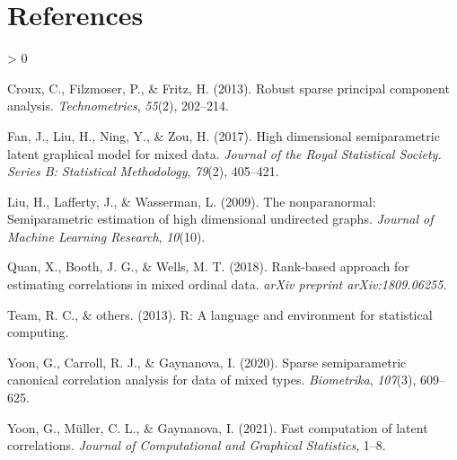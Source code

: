 \documentclass[10pt,a4paper,onecolumn]{article}
\newlength{\cslhangindent}
\newenvironment{CSLReferences}[2] %
 {%
  \setlength{\parindent}{0pt}
  \ifodd #1 \everypar{\setlength{\hangindent}{\cslhangindent}}\ignorespaces\fi
  \ifnum #2 > 0
  \setlength{\parskip}{#2\baselineskip}
  \fi
 }%
 {}
\begin{document}
\hypertarget{references}{%
\section*{References}\label{references}}

\hypertarget{refs}{}
\begin{CSLReferences}{1}{0}
\leavevmode\hypertarget{ref-croux2013robust}{}%
Croux, C., Filzmoser, P., \& Fritz, H. (2013). Robust sparse principal
component analysis. \emph{Technometrics}, \emph{55}(2), 202--214.

\leavevmode\hypertarget{ref-fan2017high}{}%
Fan, J., Liu, H., Ning, Y., \& Zou, H. (2017). High dimensional
semiparametric latent graphical model for mixed data. \emph{Journal of
the Royal Statistical Society. Series B: Statistical Methodology},
\emph{79}(2), 405--421.

\leavevmode\hypertarget{ref-liu2009nonparanormal}{}%
Liu, H., Lafferty, J., \& Wasserman, L. (2009). The nonparanormal:
Semiparametric estimation of high dimensional undirected graphs.
\emph{Journal of Machine Learning Research}, \emph{10}(10).

\leavevmode\hypertarget{ref-quan2018rank}{}%
Quan, X., Booth, J. G., \& Wells, M. T. (2018). Rank-based approach for
estimating correlations in mixed ordinal data. \emph{arXiv preprint
arXiv:1809.06255}.

\leavevmode\hypertarget{ref-team2013r}{}%
Team, R. C., \& others. (2013). R: A language and environment for
statistical computing.

\leavevmode\hypertarget{ref-yoon2020sparse}{}%
Yoon, G., Carroll, R. J., \& Gaynanova, I. (2020). Sparse semiparametric
canonical correlation analysis for data of mixed types.
\emph{Biometrika}, \emph{107}(3), 609--625.

\leavevmode\hypertarget{ref-yoon2021fast}{}%
Yoon, G., Müller, C. L., \& Gaynanova, I. (2021). Fast computation of
latent correlations. \emph{Journal of Computational and Graphical
Statistics}, 1--8.

\end{CSLReferences}
\end{document}
